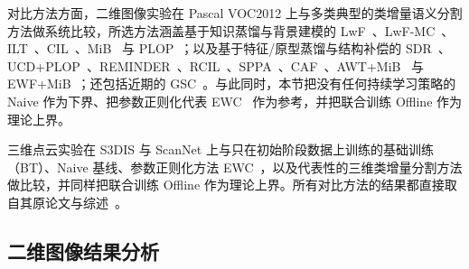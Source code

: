 对比方法方面，二维图像实验在 Pascal VOC2012 上与多类典型的类增量语义分割方法做系统比较，所选方法涵盖基于知识蒸馏与背景建模的 LwF~\citep{LWF}、LwF-MC~\citep{rebuffi2017icarl}、ILT~\citep{ILT}、CIL~\citep{CIL}、MiB~\citep{MiB} 与 PLOP~\citep{douillard2021plop}；以及基于特征/原型蒸馏与结构补偿的 SDR~\citep{SDR}、UCD+PLOP~\citep{UCD}、REMINDER~\citep{REMINDER}、RCIL~\citep{RCIL}、SPPA~\citep{SPPA}、CAF~\citep{CAF}、AWT+MiB~\citep{AWT} 与 EWF+MiB~\citep{EWF}；还包括近期的 GSC~\citep{GSC}。与此同时，本节把没有任何持续学习策略的 Naive 作为下界、把参数正则化代表 EWC~\citep{kirkpatrick2017ewc} 作为参考，并把联合训练 Offline 作为理论上界。

三维点云实验在 S3DIS 与 ScanNet 上与只在初始阶段数据上训练的基础训练（BT）、Naive 基线、参数正则化方法 EWC~\citep{kirkpatrick2017ewc}，以及代表性的三维类增量分割方法 \citet{Yang3D} 做比较，并同样把联合训练 Offline 作为理论上界。所有对比方法的结果都直接取自其原论文与综述~\citep{CSSsurvey}。

\subsection{二维图像结果分析}

